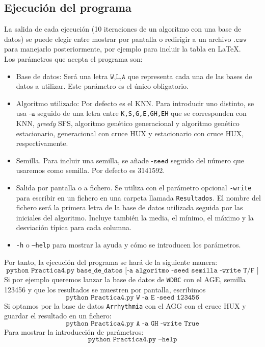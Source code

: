 \documentclass[11pt,leqno]{article}
\begin{document}
\subsection{Ejecución del programa}
La salida de cada ejecución (10 iteraciones de un algoritmo con una base de datos) se puede elegir entre mostrar por pantalla o redirigir a un archivo $\texttt{.csv}$ para manejarlo posteriormente, por ejemplo para incluir la tabla en \LaTeX.\\
Los parámetros que acepta el programa son:
\begin{itemize}
\item Base de datos: Será una letra $\texttt{W,L,A}$ que representa cada una de las bases de datos a utilizar. Este parámetro es el único obligatorio.
\item Algoritmo utilizado: Por defecto es el KNN. Para introducir uno distinto, se usa $\texttt{-a}$ seguido de una letra entre \texttt{K,S,G,E,GH,EH} que se corresponden con KNN, \textit{greedy} SFS, algoritmo genético generacional y algoritmo genético estacionario, generacional con cruce HUX y estacionario con cruce HUX, respectivamente.
\item Semilla. Para incluir una semilla, se añade $\texttt{-seed}$ seguido del número que usaremos como semilla. Por defecto es 3141592.
\item Salida por pantalla o a fichero. Se utiliza con el parámetro opcional \texttt{-write} para escribir en un fichero en una carpeta llamada \texttt{Resultados}. El nombre del fichero será la primera letra de la base de datos utilizada seguida por las iniciales del algoritmo. Incluye también la media, el mínimo, el máximo y la desviación típica para cada columna.
\item \texttt{-h} o \texttt{--help} para mostrar la ayuda y cómo se introducen los parámetros.
\end{itemize}

Por tanto, la ejecución del programa se hará de la siguiente manera:
\[ \texttt{python Practica4.py base\_de\_datos [-a algoritmo -seed semilla -write T/F ]} \]
Si por ejemplo queremos lanzar la base de datos de \texttt{WDBC} con el AGE, semilla 123456 y que los resultados se muestren por pantalla, escribimos
\[ \texttt{python Practica4.py W -a E -seed 123456}\]
Si optamos por la base de datos \texttt{Arrhythmia} con el AGG con el cruce HUX y guardar el resultado en un fichero:
\[ \texttt{python Practica4.py A -a GH -write True}\]
Para mostrar la introducción de parámetros:
\[ \texttt{python Practica4.py --help}\]
\end{document}
